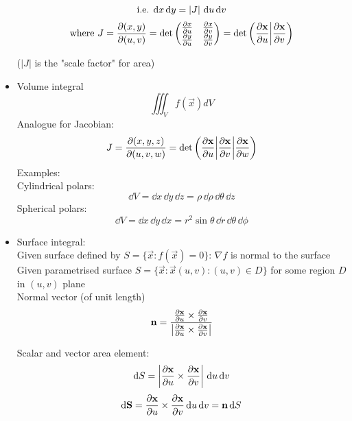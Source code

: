 \begin{itemize}
            \[\text{i.e. } \mathrm{d} x \, \mathrm{d} y = \left| J \right| \, \mathrm{d} u \, \mathrm{d} v\]
            \[\textrm{where } J = \frac{\partial{(x,y)}}{\partial{(u,v)}} =
                  \det \begin{pmatrix}
                        \frac{\partial{x}}{\partial{u}} & \frac{\partial{x}}{\partial{v}} \\
                        \frac{\partial{y}}{\partial{u}} & \frac{\partial{y}}{\partial{v}}
                  \end{pmatrix}
                  = \det\left( \frac{\partial{\boldsymbol{\mathbf{x}}}}{\partial{u}} \bigg| \frac{\partial{\boldsymbol{\mathbf{x}}}}{\partial{v}} \right)\]

            ($|J|$ is the "scale factor" for area)

      \item Volume integral
            \[\iiint_V f(\vec{x}) dV
            \]
            Analogue for Jacobian: \[J = \frac{\partial{(x,y,z)}}{\partial{(u,v,w)}} = \det\left( \frac{\partial{\boldsymbol{\mathbf{x}}}}{\partial{u}} \bigg| \frac{\partial{\boldsymbol{\mathbf{x}}}}{\partial{v}} \bigg| \frac{\partial{\boldsymbol{\mathbf{x}}}}{\partial{w}} \right)\]
            Examples: \\
            Cylindrical polars: \[ \dd V =  \dd x \, \dd y \, \dd z = \rho \, \dd \rho \, \dd \theta \, \dd z \]
            Spherical polars: \[ \dd V = \dd x \, \dd y \, \dd x = r^2 \sin \theta \, \dd r \, \dd \theta \, \dd \phi \]
      \item Surface integral: \\
            Given surface defined by $S = \{ \vec{x}: f(\vec{x}) = 0 \}$: $\nabla  f$ is normal to the surface \\
            Given parametrised surface $S = \{ \vec{x}: \vec{x}(u,v) : (u,v) \in D\}$ for some region $D$ in $(u,v)$ plane \\
            Normal vector (of unit length) \[\boldsymbol{\mathbf{n}} = \frac{\frac{\partial{\boldsymbol{\mathbf{x}}}}{\partial{u}} \times \frac{\partial{\boldsymbol{\mathbf{x}}}}{\partial{v}}} {\left| \frac{\partial{\boldsymbol{\mathbf{x}}}}{\partial{u}} \times \frac{\partial{\boldsymbol{\mathbf{x}}}}{\partial{v}} \right|} \]

            Scalar and vector area element:
            \[\mathrm{d} S = \left| \frac{\partial{\boldsymbol{\mathbf{x}}}}{\partial{u}} \times \frac{\partial{\boldsymbol{\mathbf{x}}}}{\partial{v}} \right| \, \mathrm{d} u \, \mathrm{d} v \]
            \[\mathrm{d} \boldsymbol{\mathbf{S}} = \frac{\partial{\boldsymbol{\mathbf{x}}}}{\partial{u}} \times \frac{\partial{\boldsymbol{\mathbf{x}}}}{\partial{v}} \, \mathrm{d} u \, \mathrm{d} v = \boldsymbol{\mathbf{n}} \, \mathrm{d} S
            \]
\end{itemize}

